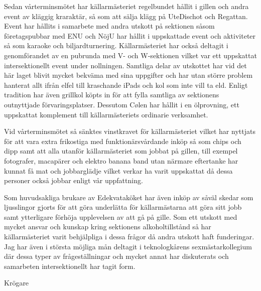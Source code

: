 \documentclass[../_main/handlingar.tex]{subfiles}
\begin{document}
\vspace{8px}

Sedan vårterminsmötet har källarmästeriet regelbundet hållit i gillen och andra event av kläggig kraraktär, så som att sälja klägg på UteDischot och Regattan. Event har hållits i samarbete med andra utskott på sektionen såsom företagspubbar med ENU och NöjU har hållit i uppskattade event och aktiviteter så som karaoke och biljardturnering. Källarmästeriet har också deltagit i genomförandet av en pubrunda med V- och W-sektionen vilket var ett uppskattat intersektionellt event under nollningen. Samtliga delar av utskottet har vid det här laget blivit mycket bekväma med sina uppgifter och har utan större problem hanterat allt ifrån elfel till kraschande iPads och kol som inte vill ta eld. Enligt tradition har även grillkol köpts in för att fylla samtliga av sektionens outnyttjade förvaringsplatser. Dessutom Cølen har hållit i en ölprovning, ett uppskattat komplement till källarmästeriets ordinarie verksamhet. 

Vid vårterminsmötet så sänktes vinstkravet för källarmästeriet vilket har nyttjats för att vara extra frikostiga med funktionärsvårdande inköp så som chips och dipp samt att alla utanför källarmästeriet som jobbat på gillen, till exempel fotografer, macapärer och elektro banana band utan närmare eftertanke har kunnat få mat och jobbarglädje vilket verkar ha varit uppskattat då dessa personer också jobbar enligt vår uppfattning. 

Som huvudsakliga brukare av Edekvataköket har även inköp av såväl skedar som ljusslingor gjorts för att göra underlätta för källarmästarna att göra sitt jobb samt ytterligare förhöja upplevelsen av att gå på gille. Som ett utskott med mycket ansvar och kunskap kring sektionens alkoholtillstånd så har källarmästeriet varit behjälpliga i dessa frågor då andra utskott haft funderingar.  Jag har även i största möjliga mån deltagit i teknologkårens sexmästarkollegium där dessa typer av frågeställningar och mycket annat har diskuterats och samarbeten intersektionellt har tagit form. 


\begin{signatures}{1}
    \mvh
    \signature{Davida Åström}{Krögare}
\end{signatures}
\end{document}
